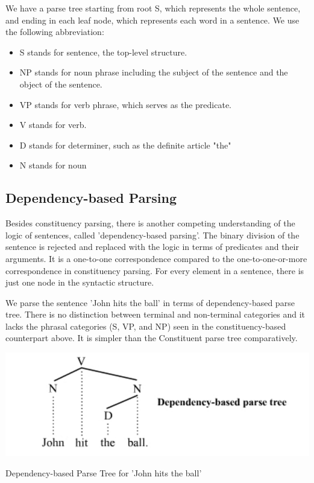 \documentclass{tufte-handout}
\begin{document}
We have a parse tree starting from root S, which represents the whole sentence, and ending in each leaf node, which represents each word in a sentence. We use the following abbreviation:

\begin{itemize}
\item S stands for sentence, the top-level structure.
\item NP stands for noun phrase including the subject of the sentence and the object of the sentence.
\item VP stands for verb phrase, which serves as the predicate.
\item V stands for verb.
\item D stands for determiner, such as the definite article "the"
\item N stands for noun
\end{itemize}


\subsection{Dependency-based Parsing}
Besides constituency parsing, there is another competing understanding of the logic of sentences, called 'dependency-based parsing'. The binary division of the sentence is rejected and replaced with the logic in terms of predicates and their arguments. It is a one-to-one correspondence compared to the one-to-one-or-more correspondence in constituency parsing. For every element in a sentence, there is just one node in the syntactic structure.

We parse the sentence 'John hits the ball' in terms of dependency-based parse tree. There is no distinction between terminal and non-terminal categories and it lacks the phrasal categories (S, VP, and NP) seen in the constituency-based counterpart above. It is simpler than the Constituent parse tree comparatively.

\begin{marginfigure}
	\centering
	\includegraphics[width=0.9\linewidth]{denpendency.png}
	\caption {Dependency-based Parse Tree for 'John hits the ball'}
	\label{fig:dependency}
\end{marginfigure}
\end{document}

